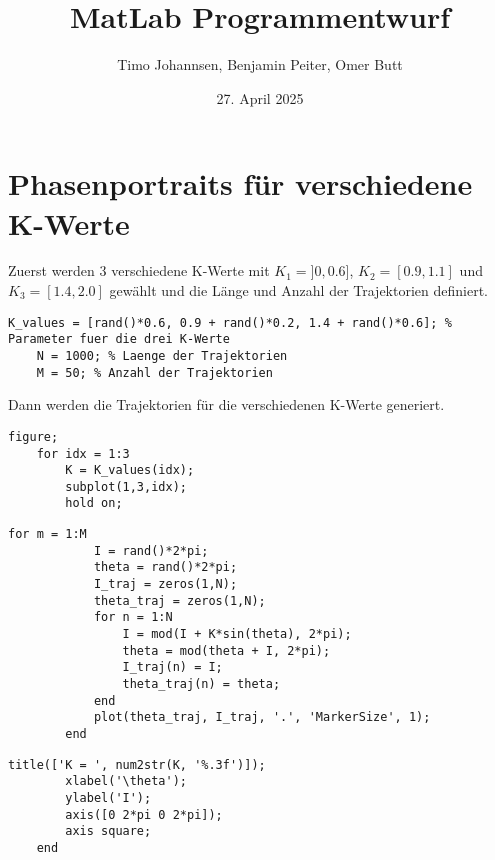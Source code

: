 \documentclass[ngerman,
                12pt,
                a4paper,
                oneside,
                bibliography=totoc,
                listof=totoc]{scrartcl}
\title{MatLab Programmentwurf}
\author{Timo Johannsen, Benjamin Peiter, Omer Butt}
\date{27. April 2025}
\begin{document}
\maketitle
\newpage
\tableofcontents
\newpage

\section{Phasenportraits für verschiedene K-Werte}
Zuerst werden 3 verschiedene K-Werte mit $K_{1} = ]0,0.6]$, $K_{2} = [0.9,1.1]$ und \hbox{$K_{3} = [1.4,2.0]$} gewählt und die Länge und Anzahl der Trajektorien definiert. 
\begin{lstlisting}[frame=single, style=Matlab-editor]
    K_values = [rand()*0.6, 0.9 + rand()*0.2, 1.4 + rand()*0.6]; % Parameter fuer die drei K-Werte
    N = 1000; % Laenge der Trajektorien
    M = 50; % Anzahl der Trajektorien
\end{lstlisting}
Dann werden die Trajektorien für die verschiedenen K-Werte generiert. 
\begin{lstlisting}[frame=single, style=Matlab-editor]
    figure;
    for idx = 1:3
        K = K_values(idx);
        subplot(1,3,idx);
        hold on;
\end{lstlisting}
\begin{lstlisting}[frame=single, style=Matlab-editor]
        for m = 1:M
            I = rand()*2*pi;
            theta = rand()*2*pi;
            I_traj = zeros(1,N);
            theta_traj = zeros(1,N);
            for n = 1:N
                I = mod(I + K*sin(theta), 2*pi);
                theta = mod(theta + I, 2*pi);
                I_traj(n) = I;
                theta_traj(n) = theta;
            end
            plot(theta_traj, I_traj, '.', 'MarkerSize', 1);
        end
\end{lstlisting}
\begin{lstlisting}[frame=single, style=Matlab-editor]
        title(['K = ', num2str(K, '%.3f')]);
        xlabel('\theta');
        ylabel('I');
        axis([0 2*pi 0 2*pi]);
        axis square;
    end
\end{lstlisting}
\end{document}
